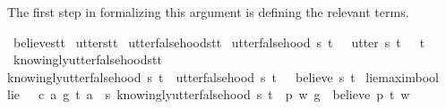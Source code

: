 \begin{isabellebody}
\begin{isamarkuptext}
The first step in formalizing this argument is defining the relevant terms.%
\end{isamarkuptext}\isamarkuptrue%
\isamarkupfalse%
\ believe{\isacharcolon}{\isacharcolon}{\isachardoublequoteopen}s{\isasymRightarrow}t{\isasymRightarrow}t{\isachardoublequoteclose}\isanewline
%
\isanewline
{}\isamarkupfalse%
\ utter{\isacharcolon}{\isacharcolon}{\isachardoublequoteopen}s{\isasymRightarrow}t{\isasymRightarrow}t{\isachardoublequoteclose}\isanewline
%
\isanewline
{}\isamarkupfalse%
\ utter{\isacharunderscore}falsehood{\isacharcolon}{\isacharcolon}{\isachardoublequoteopen}s{\isasymRightarrow}t{\isasymRightarrow}t{\isachardoublequoteclose}\ \isanewline
{\isachardoublequoteopen}utter{\isacharunderscore}falsehood\ s\ t\ {\isasymequiv}\ \ {\isacharparenleft}utter\ s\ t{\isacharparenright}\ \isactrlbold {\isasymand}\ {\isacharparenleft}\isactrlbold {\isasymnot}\ t{\isacharparenright}{\isachardoublequoteclose}\isanewline
{}\isamarkupfalse%
\ knowingly{\isacharunderscore}utter{\isacharunderscore}falsehood{\isacharcolon}{\isacharcolon}{\isachardoublequoteopen}s{\isasymRightarrow}t{\isasymRightarrow}t{\isachardoublequoteclose}\ \isanewline
{\isachardoublequoteopen}knowingly{\isacharunderscore}utter{\isacharunderscore}falsehood\ s\ t\ {\isasymequiv}\ {\isacharparenleft}utter{\isacharunderscore}falsehood\ s\ t{\isacharparenright}\ \isactrlbold {\isasymand}\ {\isacharparenleft}\isactrlbold {\isasymnot}\ {\isacharparenleft}believe\ s\ t{\isacharparenright}{\isacharparenright}{\isachardoublequoteclose}\isanewline
%
\isanewline
\isanewline
{}\isamarkupfalse%
\ lie{\isacharcolon}{\isacharcolon}{\isachardoublequoteopen}maxim{\isasymRightarrow}bool{\isachardoublequoteclose}\ \ \isanewline
{\isachardoublequoteopen}lie\ {\isasymequiv}\ {\isasymlambda}\ {\isacharparenleft}c{\isacharcomma}\ a{\isacharcomma}\ g{\isacharparenright}{\isachardot}\ {\isasymexists}t{\isachardot}\ {\isacharparenleft}a\ \isactrlbold {\isasymlongrightarrow}\ {\isacharparenleft}{\isasymlambda}s{\isachardot}\ knowingly{\isacharunderscore}utter{\isacharunderscore}falsehood\ s\ t{\isacharparenright}{\isacharparenright}\ {\isasymand}\ {\isacharparenleft}{\isasymexists}p{\isachardot}\ {\isasymforall}w{\isachardot}\ {\isacharparenleft}g\ \isactrlbold {\isasymrightarrow}\ believe\ p\ t{\isacharparenright}\ w{\isacharparenright}{\isachardoublequoteclose}\isanewline

\end{isabellebody}

